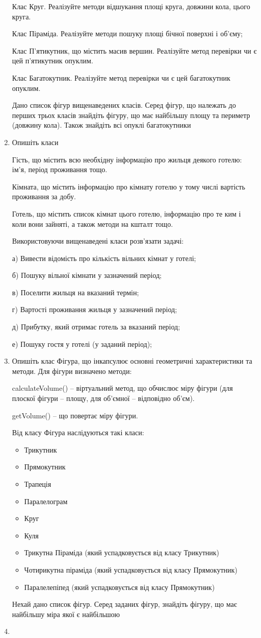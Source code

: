 \documentclass[]{article}
\begin{document}
\begin{enumerate}
Клас Круг. Реалізуйте методи відшукання площі круга, довжини кола, цього
круга.

Клас Піраміда. Реалізуйте методи пошуку площі бічної поверхні і об'єму;

Клас П'ятикутник, що містить масив вершин. Реалізуйте метод перевірки чи
є цей п'ятикутник опуклим.

Клас Багатокутник. Реалізуйте метод перевірки чи є цей багатокутник
опуклим.

Дано список фігур вищенаведених класів. Серед фігур, що належать до
перших трьох класів знайдіть фігуру, що має найбільшу площу та периметр
(довжину кола). Також знайдіть всі опуклі багатокутники

\item
Опишіть класи

Гість, що містить всю необхідну інформацію про жильця деякого готелю:
ім'я, період проживання тощо.

Кімната, що містить інформацію про кімнату готелю у тому числі вартість
проживання за добу.

Готель, що містить список кімнат цього готелю, інформацію про те ким і
коли вони зайняті, а також методи на кшталт тощо.

Використовуючи вищенаведені класи розв'язати задачі:

а) Вивести відомість про кількість вільних кімнат у готелі;

б) Пошуку вільної кімнати у зазначений період;

в) Поселити жильця на вказаний термін;

г) Вартості проживання жильця у зазначений період;

д) Прибутку, який отримає готель за вказаний період;

е) Пошуку гостя у готелі (у заданий період);

\item
Опишіть клас Фігура, що інкапсулює основні геометричні характеристики та
методи. Для фігури визначено методи:

calculateVolume() -- віртуальний метод, що обчислює міру фігури (для
плоскої фігури -- площу, для об'ємної -- відповідно об'єм).

getVolume() -- що повертає міру фігури.

Від класу Фігура наслідуються такі класи:
\begin{itemize}
\item
Трикутник
\item
Прямокутник
\item
Трапеція
\item
Паралелограм
\item
Круг
\item
Куля
\item
Трикутна Піраміда (який успадковується від класу Трикутник)
\item
Чотирикутна піраміда (який успадковується від класу Прямокутник)
\item
Паралелепіпед (який успадковується від класу Прямокутник)
\end{itemize}
Нехай дано список фігур. Серед заданих фігур, знайдіть фігуру, що має
найбільшу міра якої є найбільшою
\item


\end{enumerate}
\end{document}
